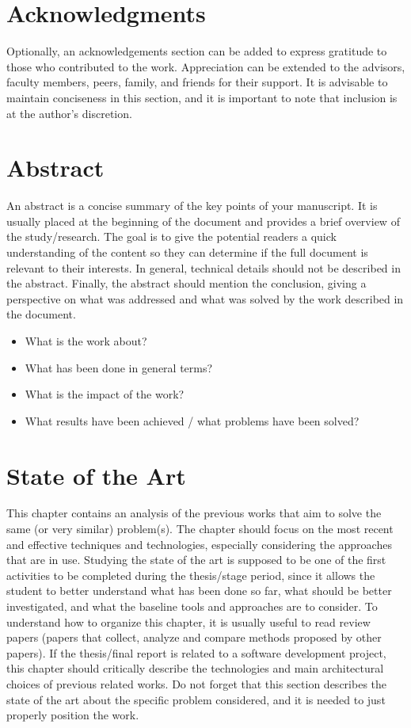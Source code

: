 
\chapter*{Acknowledgments}
Optionally, an acknowledgements section can be added to express gratitude to those who contributed to the work. Appreciation can be extended to the advisors, faculty members, peers, family, and friends for their support. It is advisable to maintain conciseness in this section, and it is important to note that inclusion is at the author's discretion.

\chapter*{Abstract}
An abstract is a concise summary of the key points of your manuscript. It is usually placed at the beginning of the document and provides a brief overview of the study/research. The goal is to give the potential readers a quick understanding of the content so they can determine if the full document is relevant to their interests. In general, technical details should not be described in the abstract. Finally, the abstract should mention the conclusion, giving a perspective on what was addressed and what was solved by the work described in the document.

\begin{itemize}
    \item What is the work about?
    \item What has been done in general terms?
    \item What is the impact of the work?
    \item What results have been achieved / what problems have been solved?
\end{itemize}

\clearpage

\chapter{State of the Art}
This chapter contains an analysis of the previous works that aim to solve the same (or very similar) problem(s). The chapter should focus on the most recent and effective techniques and technologies, especially considering the approaches that are in use. Studying the state of the art is supposed to be one of the first activities to be completed during the thesis/stage period, since it allows the student to better understand what has been done so far, what should be better investigated, and what the baseline tools and approaches are to consider.
To understand how to organize this chapter, it is usually useful to read review papers (papers that collect, analyze and compare methods proposed by other papers).
If the thesis/final report is related to a software development project, this chapter should critically describe the technologies and main architectural choices of previous related works.
Do not forget that this section describes the state of the art about the specific problem considered, and it is needed to just properly position the work.

